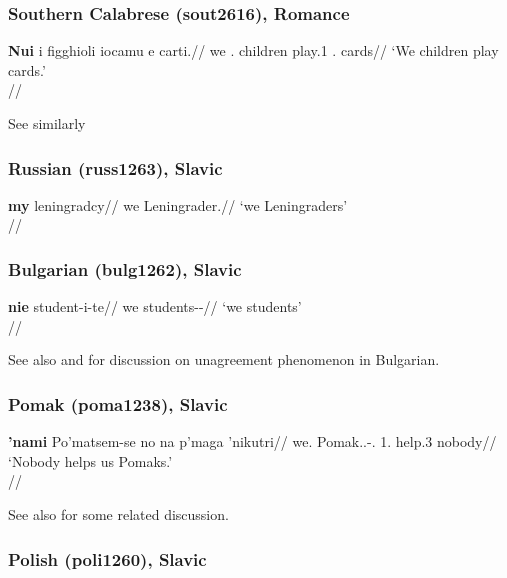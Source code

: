 \subsubsection{Southern Calabrese (sout2616), Romance}

\ex \begingl
\gla \textbf{Nui} i figghioli iocamu e carti.//
\glb we \Det.\Pl{} children play.1\Pl{} \Det.\Pl{} cards//
\glft `We children play cards.'\\\citep[276, (23c)]{hoehnetalICGLcalabria}//
\endgl
\xe

See similarly \citet[142]{hoehnetal2016CalabrUnagr}

\subsubsection{Russian (russ1263), Slavic}

\ex \begingl
\gla \textbf{my} leningradcy//
\glb we Leningrader.\Pl//
\glft `we Leningraders'\\\citep[352, (4c)]{pesetsky1978}//
\endgl
\xe

\newpage

\subsubsection{Bulgarian (bulg1262), Slavic}

\ex \begingl
\gla \textbf{nie} student-i-te//
\glb we students-\Pl-\Def//
\glft `we students'\\\citep[560]{hoehn2015unagr}//
\endgl
\xe

See also \citet{osenova2003} and \citet{norman2001} for discussion on unagreement phenomenon in Bulgarian.


\subsubsection{Pomak (poma1238), Slavic}

\ex
\begingl
\gla \textbf{'nami} Po'matsem-se no na p\textturnv{}'maga 'nikutri//
\glb we.\Dat{} Pomak.\Dat.\Pl{}-\Det.\Prox{} 1\Pl.\Acc{} \Neg{} help.3\Sg{} nobody//
\glft `Nobody helps us Pomaks.'\\ \citep[582]{papadimitriou2008}//
\endgl
\xe 

See also \citet[269--272]{hoehnPhD} for some related discussion.

\subsubsection{Polish (poli1260), Slavic}

